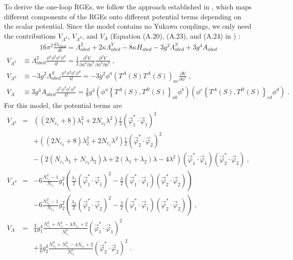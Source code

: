 To derive the one-loop RGEs, we follow the approach established in \cite{Bajc:2021}, which maps different components of the RGEs onto different potential terms depending on the scalar potential. Since the model contains no Yukawa couplings, we only need the contributions $V_{\Lambda^2}$, $V_{\Lambda^S}$, and $V_{A}$ (Equation (A.20), (A.23), and (A.24) in \cite{Bajc:2021}) :
\begin{align}
\label{machacekhiggs}
16\pi^2\frac{d\lambda_{abcd}}{dt}=\Lambda^2_{abcd}+2\kappa\Lambda^Y_{abcd}-8\kappa H_{abcd}
-3g^2\Lambda^S_{abcd}+3g^4A_{abcd}
\end{align}
\begin{align}
    \label{VL2}
    V_{\Lambda^2}&\equiv\Lambda^2_{abcd}\frac{\phi^a\phi^b\phi^c\phi^d}{4!}
    =\frac{1}{2}\frac{\partial^2V}{\partial\phi^a\partial\phi^b}\frac{\partial^2V}{\partial\phi^a\partial\phi^b}\;,\\
    \label{VLS}
    V_{\Lambda^S}&\equiv-3g^2\Lambda^S_{abcd}\frac{\phi^a\phi^b\phi^c\phi^d}{4!}
    =-3g^2\phi^a\left(T^A(S)T^A(S)\right)_{ae}\frac{\partial V}{\partial\phi^e}\;,\\
    \label{VA}
    V_A&\equiv3g^4A_{abcd}\frac{\phi^a\phi^b\phi^c\phi^d}{4!}
    =\frac{3}{8}g^4\left(\phi^a\left\{T^A(S),T^B(S)\right\}_{ab}\phi^b\right)\left(\phi^c\left\{T^A(S),T^B(S)\right\}_{cd}\phi^d\right)\;.
\end{align}
For this model, the potential terms are
\begin{align}
    V_{\Lambda^2}&=&
    \left(\left(2N_{c_1}+8\right)\lambda_1^2+2N_{c_2}\lambda^2\right)\frac{1}{2}
    \left(\vec{\varphi}_1^*\cdot\vec{\varphi}_1\right)^2\nonumber\\
    &&+\left(\left(2N_{c_2}+8\right)\lambda_2^2+2N_{c_1}\lambda^2\right)\frac{1}{2}
    \left(\vec{\varphi}_2^*\cdot\vec{\varphi}_2\right)^2\\
    &&-\left(2\left(N_{c_1}\lambda_1+N_{c_2}\lambda_2\right)\lambda+2\left(\lambda_1+\lambda_2\right)\lambda-4\lambda^2\right)
    \left(\vec{\varphi}_1^*\cdot\vec{\varphi}_1\right)\left(\vec{\varphi}_2^*\cdot\vec{\varphi}_2\right)\;,\nonumber\\
    V_{\Lambda^S}&=&
    -6\frac{N_{c_1}^2-1}{N_{c_1}}g_1^2\left(\frac{\lambda_1}{2}\left(\vec{\varphi}_1^*\cdot\vec{\varphi}_1\right)^2
    -\frac{\lambda}{2}\left(\vec{\varphi}_1^*\cdot\vec{\varphi}_1\right)\left(\vec{\varphi}_2^*\cdot\vec{\varphi}_2\right)\right)\nonumber\\
    &&
    -6\frac{N_{c_2}^2-1}{N_{c_2}}g_2^2\left(\frac{\lambda_2}{2}\left(\vec{\varphi}_2^*\cdot\vec{\varphi}_2\right)^2
    -\frac{\lambda}{2}\left(\vec{\varphi}_1^*\cdot\vec{\varphi}_1\right)\left(\vec{\varphi}_2^*\cdot\vec{\varphi}_2\right)\right)\;,\\
    V_{A}&=&\frac{3}{4}g_1^4\frac{N_{c_1}^3+N_{c_1}^2-4N_{c_1}+2}{N_{c_1}^2}
    \left(\vec{\varphi}_1^*\cdot\vec{\varphi}_1\right)^2\nonumber\\
    &&+\frac{3}{4}g_2^4\frac{N_{c_2}^3+N_{c_2}^2-4N_{c_2}+2}{N_{c_2}^2}
    \left(\vec{\varphi}_2^*\cdot\vec{\varphi}_2\right)^2\;.
\end{align}

